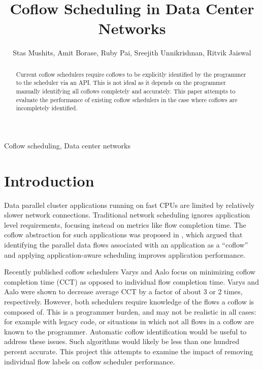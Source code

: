 \documentclass[conference]{IEEEtran}
\title{Coflow Scheduling in Data Center Networks}
\begin{document}
\author{ Stas Mushits, Amit Borase, Ruby Pai, Sreejith Unnikrishnan, Ritvik Jaiswal }

\maketitle


\begin{abstract}
Current coflow schedulers require coflows to be explicitly identified by the programmer to the scheduler via an API. This is not ideal as it depends on the programmer manually identifying all coflows completely and accurately. This paper attempts to evaluate the performance of existing coflow schedulers in the case where coflows are incompletely identified.
\end{abstract}

\begin{IEEEkeywords}
Coflow scheduling, Data center networks
\end{IEEEkeywords}

\section{Introduction}

Data parallel cluster applications running on fast CPUs are limited by relatively slower network connections. Traditional network scheduling ignores application level requirements, focusing instead on metrics like flow completion time. The coflow abstraction for such applications was proposed in \cite{coflow}, which argued that identifying the parallel data flows associated with an application as a ``coflow'' and applying application-aware scheduling improves application performance.

Recently published coflow schedulers Varys \cite{varys} and Aalo \cite{aalo} focus on minimizing coflow completion time (CCT) as opposed to individual flow completion time. Varys and Aalo were shown to decrease average CCT by a factor of about 3 or 2 times, respectively. However, both schedulers require knowledge of the flows a coflow is composed of. This is a programmer burden, and may not be realistic in all cases: for example with legacy code, or situations in which not all flows in a coflow are known to the programmer. Automatic coflow identification would be useful to address these issues. Such algorithms would likely be less than one hundred percent accurate. This project this attempts to examine the impact of removing individual flow labels on coflow scheduler performance.
\end{document}
